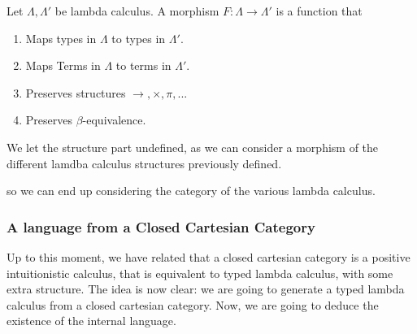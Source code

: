 \begin{definition}
\begin{definition}
  Let $\Lambda, \Lambda '$ be lambda calculus. A morphism $F: \Lambda \to \Lambda '$ is a function that
  \begin{enumerate}
  \item Maps types in $\Lambda$ to types in $\Lambda '$.
  \item Maps Terms in $\Lambda$ to terms in $\Lambda '$.
  \item Preserves structures $\to, \times, \pi, ...$
  \item Preserves $\beta$-equivalence.
\end{enumerate}
\end{definition}
\begin{remark}
We let the structure part undefined, as we can consider a morphism of the different lamdba calculus structures previously defined.
\end{remark}
so we can end up considering the category of the various lambda calculus. 



\subsubsection{A language from a Closed Cartesian Category}

Up to this moment, we have related that a closed cartesian category is a positive intuitionistic calculus, that is equivalent to  typed lambda calculus, with some extra structure. The idea is now clear: we are going to generate a typed lambda calculus from a closed cartesian category. Now, we are going to deduce the existence of the internal language.\\








\end{definition}
